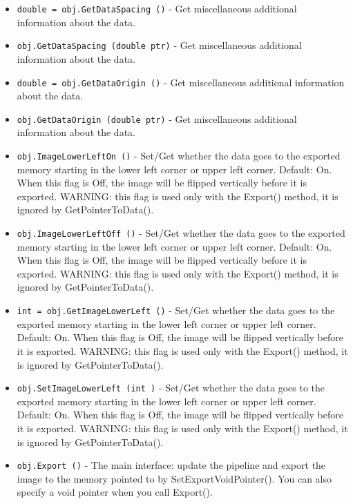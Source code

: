 \begin{itemize}
\item  \verb|double = obj.GetDataSpacing ()| -  Get miscellaneous additional information about the data.

\item  \verb|obj.GetDataSpacing (double ptr)| -  Get miscellaneous additional information about the data.

\item  \verb|double = obj.GetDataOrigin ()| -  Get miscellaneous additional information about the data.

\item  \verb|obj.GetDataOrigin (double ptr)| -  Get miscellaneous additional information about the data.

\item  \verb|obj.ImageLowerLeftOn ()| -  Set/Get whether the data goes to the exported memory starting 
 in the lower left corner or upper left corner.  Default: On.
 When this flag is Off, the image will be flipped vertically
 before it is exported.
 WARNING: this flag is used only with the Export() method,
 it is ignored by GetPointerToData().

\item  \verb|obj.ImageLowerLeftOff ()| -  Set/Get whether the data goes to the exported memory starting 
 in the lower left corner or upper left corner.  Default: On.
 When this flag is Off, the image will be flipped vertically
 before it is exported.
 WARNING: this flag is used only with the Export() method,
 it is ignored by GetPointerToData().

\item  \verb|int = obj.GetImageLowerLeft ()| -  Set/Get whether the data goes to the exported memory starting 
 in the lower left corner or upper left corner.  Default: On.
 When this flag is Off, the image will be flipped vertically
 before it is exported.
 WARNING: this flag is used only with the Export() method,
 it is ignored by GetPointerToData().

\item  \verb|obj.SetImageLowerLeft (int )| -  Set/Get whether the data goes to the exported memory starting 
 in the lower left corner or upper left corner.  Default: On.
 When this flag is Off, the image will be flipped vertically
 before it is exported.
 WARNING: this flag is used only with the Export() method,
 it is ignored by GetPointerToData().

\item  \verb|obj.Export ()| -  The main interface: update the pipeline and export the image
 to the memory pointed to by SetExportVoidPointer().  You can
 also specify a void pointer when you call Export().

\end{itemize}
